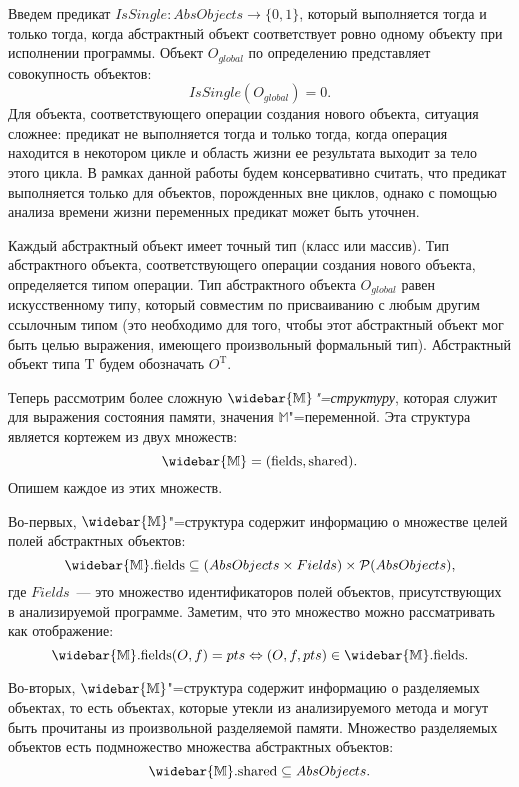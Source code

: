 \documentclass[14pt,titlepage,draft]{extarticle}
\newcommand{\M}{\ensuremath{\mathbb{M}}}
\newcommand{\Ms}{\ensuremath{\mathbb{\widebar{M}}}}
\newcommand{\Mf}[1]{\ensuremath{\mathrm{#1}}}
\newcommand{\type}[1]{\mathrm{#1}}
\newcommand{\AOTyped}[1]{O^{\type{#1}}}
\newcommand{\AO}{O}
\newcommand{\AOGlobal}{\AO_{global}}
\begin{document}
    Введем предикат $IsSingle\colon AbsObjects \to \{0, 1\}$, который
    выполняется тогда и только тогда, когда абстрактный объект соответствует
    ровно одному объекту при исполнении программы. Объект $\AOGlobal$ по
    определению представляет совокупность объектов:
    \[ IsSingle(\AOGlobal) = 0. \]
    Для объекта, соответствующего операции создания нового объекта, ситуация
    сложнее: предикат не выполняется тогда и только тогда, когда операция
    находится в некотором цикле и область жизни ее результата выходит за тело
    этого цикла. В рамках данной работы будем консервативно считать, что
    предикат выполняется только для объектов, порожденных вне циклов, однако с
    помощью анализа времени жизни переменных предикат может быть уточнен.

    Каждый абстрактный объект имеет точный тип (класс или массив). Тип
    абстрактного объекта, соответствующего операции создания нового объекта,
    определяется типом операции. Тип абстрактного объекта $\AOGlobal$ равен
    искусственному типу, который совместим по присваиванию с любым другим
    ссылочным типом (это необходимо для того, чтобы этот абстрактный объект мог
    быть целью выражения, имеющего произвольный формальный тип). Абстрактный
    объект типа $\type{T}$ будем обозначать $\AOTyped{T}$.

    Теперь рассмотрим более сложную \emph{\Ms"=структуру}, которая служит для
    выражения состояния памяти, значения \M"=переменной.
    Эта структура является кортежем из двух множеств:
    \[ \Ms = (\Mf{fields}, \Mf{shared}). \]
    Опишем каждое из этих множеств.

    Во-первых, \Ms"=структура содержит информацию о множестве целей полей
    абстрактных объектов:
    \[
      \Ms.\Mf{fields} \subseteq
        (AbsObjects \times Fields) \times
        \powerset{AbsObjects},
    \]
    где $Fields$~--- это множество идентификаторов полей объектов,
    присутствующих в анализируемой программе.
    Заметим, что это множество можно рассматривать как отображение:
    \[
      \Ms.\Mf{fields}(O, f) = pts \Leftrightarrow
        (O, f, pts) \in \Ms.\Mf{fields}.
    \]

    Во-вторых, \Ms"=структура содержит информацию о разделяемых объектах,
    то есть объектах, которые утекли  из анализируемого метода
    и могут быть прочитаны из произвольной разделяемой памяти. Множество
    разделяемых объектов есть подмножество множества абстрактных объектов:
    \[ \Ms.\Mf{shared} \subseteq AbsObjects. \]
\end{document}
